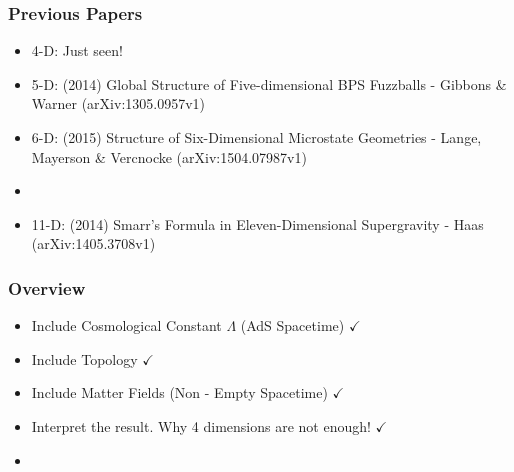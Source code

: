 \documentclass[t]{beamer}
\begin{document}
\begin{frame}
\frametitle{Previous Papers}

\begin{itemize}
\setlength{\parskip}{18pt}
\item 4-D: Just seen!
\item 5-D: (2014) Global Structure of Five-dimensional BPS Fuzzballs - Gibbons \& Warner (arXiv:1305.0957v1)
\item 6-D: (2015) Structure of Six-Dimensional Microstate Geometries - Lange, Mayerson \& Vercnocke (arXiv:1504.07987v1)
\item {}
\item 11-D: (2014) Smarr's Formula in Eleven-Dimensional Supergravity - Haas (arXiv:1405.3708v1)

\end{itemize}
\end{frame}


\begin{frame}
\frametitle{Overview}

\begin{itemize}
\setlength{\parskip}{10pt}
\item Include Cosmological Constant $\Lambda$ (AdS Spacetime) $\checkmark$
\item Include Topology $\checkmark$
\item Include Matter Fields (Non - Empty Spacetime) $\checkmark$
\item Interpret the result. Why 4 dimensions are not enough! $\checkmark$
\item  {}
\end{itemize}
\end{frame}

\end{document}
